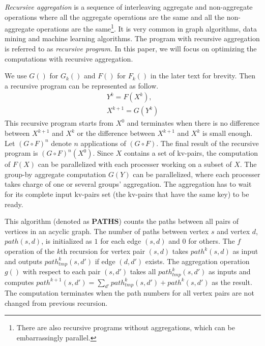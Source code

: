 \emph{Recursive aggregation} is a sequence of interleaving aggregate and non-aggregate operations where all the aggregate operations are the same and all the non-aggregate operations are the same\footnote{There are also recursive programs without aggregations, which can be embarrassingly parallel.}. It is very common in graph algorithms, data mining and machine learning algorithms. The program with recursive aggregation is referred to as \emph{recursive program}. In this paper, we will focus on optimizing the computations with recursive aggregation.

We use $G()$ for $G_k()$ and $F()$ for $F_k()$ in the later text for brevity. Then a recursive program can be represented as follow.
\begin{equation}
\label{eq:recursive2}
\begin{aligned}
Y^{k}=F(X^k),\\
X^{k+1}=G(Y^k)
\end{aligned}
\end{equation}
This recursive program starts from $X^0$ and terminates when there is no difference between $X^{k+1}$ and $X^k$ or the difference between $X^{k+1}$ and $X^k$ is small enough. Let $(G\circ F)^n$ denote $n$ applications of $(G\circ F)$. The final result of the recursive program is $(G\circ F)^n(X^0)$. Since $X$ contains a set of kv-pairs, the computation of $F(X)$ can be parallelized with each processer working on a subset of $X$. The group-by aggregate computation $G(Y)$ can be parallelized, where each processer takes charge of one or several groups' aggregation. The aggregation has to wait for its complete input kv-pairs set (the kv-pairs that have the same key) to be ready. 

 This algorithm (denoted as \textbf{PATHS}) counts the paths between all pairs of vertices in an acyclic graph. The number of paths between vertex $s$ and vertex $d$, $path(s,d)$, is initialized as $1$ for each edge $(s,d)$ and $0$ for others. The $f$ operation of the $k$th recursion for vertex pair $(s,d)$ takes $path^k(s,d)$ as input and outputs $path_{tmp}^k(s,d')$ if edge $(d,d')$ exists. The aggregation operation $g()$ with respect to each pair $(s,d')$ takes all $path_{tmp}^k(s,d')$ as inputs and computes $path^{k+1}(s,d')=\sum_{d'} path_{tmp}^k(s,d')+path^k(s,d')$ as the result. The computation terminates when the path numbers for all vertex pairs are not changed from previous recursion.

